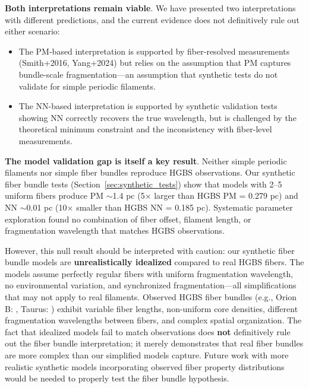 \documentclass[twoside,twocolumn]{mnras}
\begin{document}
\textbf{Both interpretations remain viable}. We have presented two interpretations with different predictions, and the current evidence does not definitively rule out either scenario:

\begin{itemize}
    \item The PM-based interpretation is supported by fiber-resolved measurements (Smith+2016, Yang+2024) but relies on the assumption that PM captures bundle-scale fragmentation---an assumption that synthetic tests do not validate for simple periodic filaments.

    \item The NN-based interpretation is supported by synthetic validation tests showing NN correctly recovers the true wavelength, but is challenged by the theoretical minimum constraint and the inconsistency with fiber-level measurements.
\end{itemize}

\textbf{The model validation gap is itself a key result}. Neither simple periodic filaments nor simple fiber bundles reproduce HGBS observations. Our synthetic fiber bundle tests (Section~\ref{sec:synthetic_tests}) show that models with 2--5 uniform fibers produce PM $\sim$1.4 pc (5$\times$ larger than HGBS PM = 0.279 pc) and NN $\sim$0.01 pc (10$\times$ smaller than HGBS NN = 0.185 pc). Systematic parameter exploration found no combination of fiber offset, filament length, or fragmentation wavelength that matches HGBS observations.

However, this null result should be interpreted with caution: our synthetic fiber bundle models are \textbf{unrealistically idealized} compared to real HGBS fibers. The models assume perfectly regular fibers with uniform fragmentation wavelength, no environmental variation, and synchronized fragmentation---all simplifications that may not apply to real filaments. Observed HGBS fiber bundles (e.g., Orion B: \citet{Yang2024}, Taurus: \citet{Hacar2013}) exhibit variable fiber lengths, non-uniform core densities, different fragmentation wavelengths between fibers, and complex spatial organization. The fact that idealized models fail to match observations does \textbf{not} definitively rule out the fiber bundle interpretation; it merely demonstrates that real fiber bundles are more complex than our simplified models capture. Future work with more realistic synthetic models incorporating observed fiber property distributions would be needed to properly test the fiber bundle hypothesis.
\end{document}
